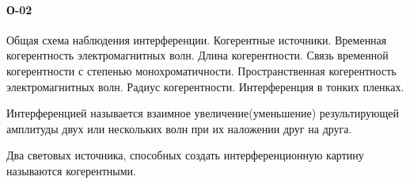 


\paragraph{О-02}
Общая схема наблюдения интерференции. Когерентные источники. Временная когерентность электромагнитных волн. Длина когерентности. Связь временной когерентности с степенью монохроматичности. Пространственная когерентность электромагнитных волн. Радиус когерентности. Интерференция в тонких пленках.\\

\begin{definition}
Интерференцией называется взаимное увеличение(уменьшение) результирующей амплитуды двух или нескольких волн при их наложении друг на друга.
\end{definition}

\begin{definition}
Два световых источника, способных создать интерференционную картину называются когерентными.
\end{definition}


